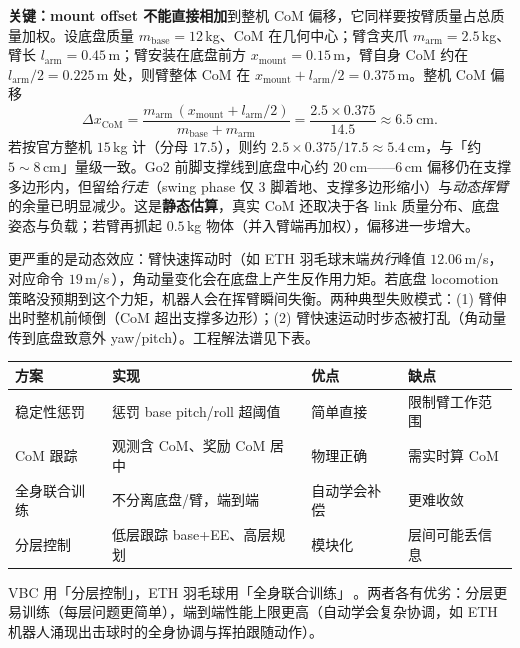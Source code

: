 \begin{derivation}\label{der:rlmc-lm-com}
\textbf{关键：mount offset 不能直接相加}到整机 CoM 偏移，它同样要按臂质量占总质量加权。设底盘质量 $m_{\text{base}}=12\,$kg、CoM 在几何中心；臂含夹爪 $m_{\text{arm}}=2.5\,$kg、臂长 $l_{\text{arm}}=0.45\,$m；臂安装在底盘前方 $x_{\text{mount}}=0.15\,$m，臂自身 CoM 约在 $l_{\text{arm}}/2=0.225\,$m 处，则臂整体 CoM 在 $x_{\text{mount}}+l_{\text{arm}}/2=0.375\,$m。整机 CoM 偏移
\begin{equation}
\Delta x_{\text{CoM}} = \frac{m_{\text{arm}}\,(x_{\text{mount}}+l_{\text{arm}}/2)}{m_{\text{base}}+m_{\text{arm}}}
= \frac{2.5\times 0.375}{14.5}\approx 6.5\ \text{cm}.
\label{eq:rlmc-lm-com}
\end{equation}
若按官方整机 $15\,$kg 计（分母 $17.5$），则约 $2.5\times0.375/17.5\approx 5.4\,$cm，与「约 $5\!\sim\!8\,$cm」量级一致。Go2 前脚支撑线到底盘中心约 $20\,$cm——$6\,$cm 偏移仍在支撑多边形内，但留给\emph{行走}（swing phase 仅 3 脚着地、支撑多边形缩小）与\emph{动态挥臂}的余量已明显减少。这是\textbf{静态估算}，真实 CoM 还取决于各 link 质量分布、底盘姿态与负载；若臂再抓起 $0.5\,$kg 物体（并入臂端再加权），偏移进一步增大。
\end{derivation}

更严重的是动态效应：臂快速挥动时（如 ETH 羽毛球末端\emph{执行}峰值 $12.06\,$m/s，对应命令 $19\,$m/s\,\cite{ma2025badminton}），角动量变化会在底盘上产生反作用力矩。若底盘 locomotion 策略没预期到这个力矩，机器人会在挥臂瞬间失衡。两种典型失败模式：(1) 臂伸出时整机前倾倒（CoM 超出支撑多边形）；(2) 臂快速运动时步态被打乱（角动量传到底盘致意外 yaw/pitch）。工程解法谱见下表。

\begin{center}
\small
\begin{tabular}{@{}llll@{}}
\toprule
方案 & 实现 & 优点 & 缺点 \\
\midrule
稳定性惩罚 & 惩罚 base pitch/roll 超阈值 & 简单直接 & 限制臂工作范围 \\
CoM 跟踪 & 观测含 CoM、奖励 CoM 居中 & 物理正确 & 需实时算 CoM \\
全身联合训练 & 不分离底盘/臂，端到端 & 自动学会补偿 & 更难收敛 \\
分层控制 & 低层跟踪 base+EE、高层规划 & 模块化 & 层间可能丢信息 \\
\bottomrule
\end{tabular}
\end{center}

VBC 用「分层控制」，ETH 羽毛球用「全身联合训练」\,\cite{liu2024vbc,ma2025badminton}。两者各有优劣：分层更易训练（每层问题更简单），端到端性能上限更高（自动学会复杂协调，如 ETH 机器人涌现出击球时的全身协调与挥拍跟随动作）。


